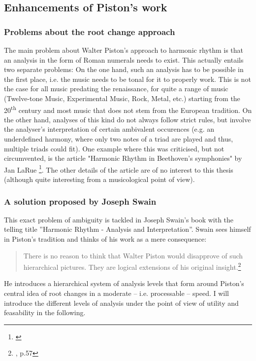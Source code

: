 \documentclass[a4paper,12pt]{report}
\begin{document}
\subsection{Enhancements of Piston's work}
\subsubsection{Problems about the root change approach}
The main problem about Walter Piston's approach to harmonic rhythm is that an analysis in the form of Roman numerals needs to exist. This actually entails two separate problems: On the one hand, such an analysis has to be possible in the first place, i.e. the music needs to be tonal for it to properly work. This is not the case for all music predating the renaissance, for quite a range of music (Twelve-tone Music, Experimental Music, Rock, Metal, etc.) starting from the 20\textsuperscript{th} century and most music that does not stem from the European tradition. On the other hand, analyses of this kind do not always follow strict rules, but involve the analyser's interpretation of certain ambivalent occurences (e.g. an underdefined harmony, where only two notes of a triad are played and thus, multiple triads could fit). One example where this was criticised, but not circumvented, is the article "Harmonic Rhythm in Beethoven's symphonies" by Jan LaRue \footnote{\cite{la2001harmonic}}. The other details of the article are of no interest to this thesis (although quite interesting from a musicological point of view).

\subsubsection{A solution proposed by Joseph Swain}
This exact problem of ambiguity is tackled in Joseph Swain's book with the telling title ''Harmonic Rhythm - Analysis and Interpretation''. Swain sees himself in Piston's tradition and thinks of his work as a mere consequence: \begin{quote}There is no reason to think that Walter Piston would disapprove of such hierarchical pictures. They are logical extensions of his original insight.\footnote{\cite{swain2002harmonic}, p.57}\end{quote} He introduces a hierarchical system of analysis levels that form around Piston's central idea of root changes in a moderate -- i.e. processable -- speed. I will introduce the different levels of analysis under the point of view of utility and feasability in the following.
\end{document}
